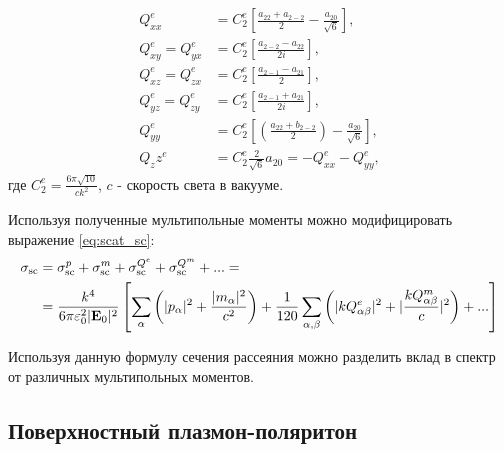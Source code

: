 \begin{align*}
    Q_{xx}^e &= C_2^e \left[ \frac{a_{22}+a_{2-2}}{2} - \frac{a_{20}}{\sqrt{6}} \right], \\
    Q_{xy}^e = Q_{yx}^e &= C_2^e \left[ \frac{a_{2-2}-a_{22}}{2 i} \right], \\
    Q_{xz}^e = Q_{zx}^e &= C_2^e \left[ \frac{a_{2-1}-a_{21}}{2}  \right],\\
    Q_{yz}^e = Q_{zy}^e &= C_2^e \left[ \frac{a_{2-1}+a_{21}}{2i} \right],\\
    Q_{yy}^e &= C_2^e \left[ \left( \frac{a_{22}+b_{2-2}}{2} \right)  -\frac{a_{20}}{\sqrt{6}}\right],\\
    Q_zz^e &= C_2^e \frac{2 }{\sqrt{6}} a_{20} = -Q_{xx}^e -Q_{yy}^e,
\end{align*}
где $C_2^e = \frac{6 \pi \sqrt{10}}{c k^2}$, $c$ - скорость света в вакууме. 

Используя полученные мультипольные моменты можно модифицировать выражение \eqref{eq:scat_sc}:
\begin{align*}
    \sigma_{\text{sc}} &= \sigma_{\text{sc}}^p + \sigma_{\text{sc}}^m + \sigma_{\text{sc}}^{Q^e} +
    \sigma_{\text{sc}}^{Q^m} + ... = \\ &= \frac{k^4}{6 \pi \varepsilon_0^2 |\vb{E}_0|^2 } \left[ \sum_{\alpha}\left( |p_{\alpha}|^2 + 
    \frac{| m_{\alpha}|^2}{c^2} \right) + \frac{1}{120} \sum_{\alpha,\beta} \left( |k Q_{\alpha \beta}^e|^2 + |\frac{k Q_{\alpha \beta}^m}{c}|^2 \right) + ...\right]
\end{align*}

Используя данную формулу сечения рассеяния можно разделить вклад в спектр от различных мультипольных моментов. 

\subsection{Поверхностный плазмон-поляритон}\label{subsec:spp}













